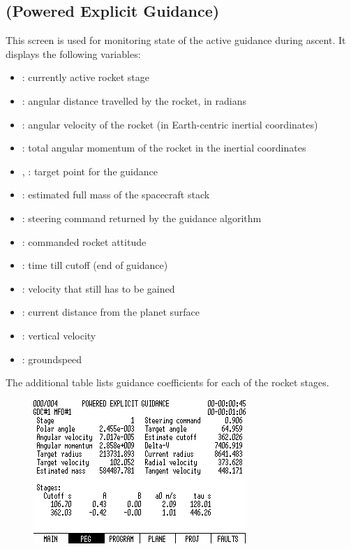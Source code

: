 \subsection{ (Powered Explicit Guidance)}
This screen is used for monitoring state of the active guidance during ascent. It displays the following variables:
\begin{itemize}
	\item {}: currently active rocket stage
	\item {}: angular distance travelled by the rocket, in radians
	\item {}: angular velocity of the rocket (in Earth-centric inertial coordinates)
	\item {}: total angular momentum of the rocket in the inertial coordinates
	\item {}, : target point for the guidance
	\item {}: estimated full mass of the spacecraft stack
	\item {}: steering command returned by the guidance algorithm
	\item {}: commanded rocket attitude
	\item {}: time till cutoff (end of guidance)
	\item {}: velocity that still has to be gained
	\item {}: current distance from the planet surface
	\item {}: vertical velocity
	\item {}: groundspeed
\end{itemize}

The additional table lists guidance coefficients for each of the rocket stages.

\begin{figure}[htb]
\centering
\includegraphics[bb=0 0 9cm 7cm,scale=0.50]{../graphics/rv550_screen2.png}
\end{figure}


